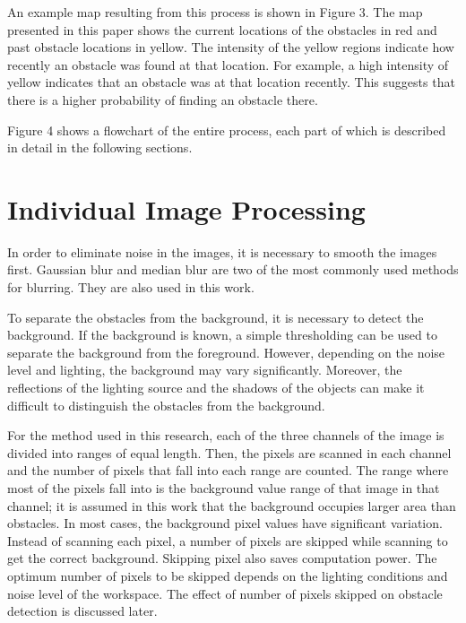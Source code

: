 \documentclass[twocolumn,10pt]{asme2e}
\begin{document}
An example map resulting from this process is shown in Figure 3. The map presented in this paper shows the current locations of the obstacles in red and past obstacle locations in yellow. The intensity of the yellow regions indicate how recently an obstacle was found at that location. For example, a high intensity of yellow indicates that an obstacle was at that location recently. This suggests that there is a higher probability of finding an obstacle there.


Figure 4 shows a flowchart of the entire process, each part of which is described in detail in the following sections.

\section*{Individual Image Processing}

In order to eliminate noise in the images, it is necessary to smooth the images first. Gaussian blur and median blur are two of the most commonly used methods for blurring. They are also used in this work. 

To separate the obstacles from the background, it is necessary to detect the background. If the background is known, a simple thresholding can be used to separate the background from the foreground. However, depending on the noise level and lighting, the background may vary significantly. Moreover, the reflections of the lighting source and the shadows of the objects can make it difficult to distinguish the obstacles from the background. 

 For the method used in this research, each of the three channels of the image is divided into ranges of equal length. Then, the pixels are scanned in each channel and the number of pixels that fall into each range are counted. The range where most of the pixels fall into is the background value range of that image in that channel; it is assumed in this work that the background occupies larger area than obstacles. In most cases, the background pixel values have significant variation. Instead of scanning each pixel, a number of pixels are skipped while scanning to get the correct background. Skipping pixel also saves computation power. The optimum number of pixels to be skipped depends on the lighting conditions and noise level of the workspace. The effect of number of pixels skipped on obstacle detection is discussed later.
\end{document}

